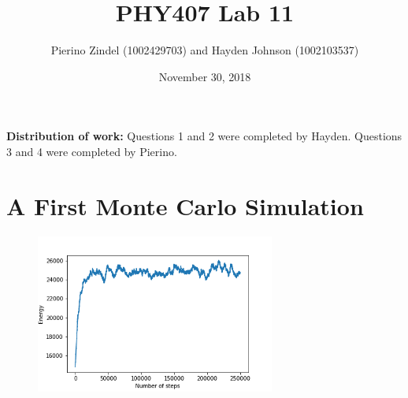 \documentclass{article}
\title{PHY407 Lab 11}
\author{Pierino Zindel (1002429703) and Hayden Johnson (1002103537)}
\date{November 30, 2018}
\begin{document}
\maketitle

\noindent \textbf{Distribution of work:} Questions 1 and 2 were completed by Hayden. Questions 3 and 4 were completed by Pierino.

\section{A First Monte Carlo Simulation}

\begin{figure}[H]
	\centering
	\includegraphics[width=0.7\textwidth]{../images/q1a_energy.png}
	\caption{}
\end{figure}
\end{document}
